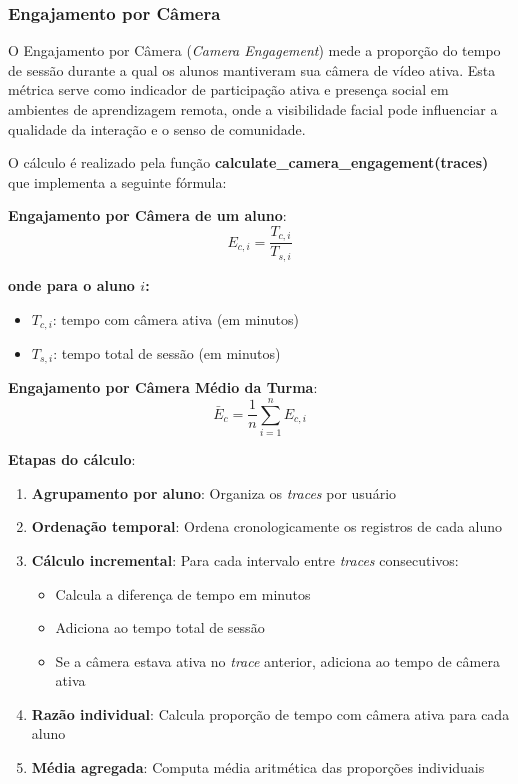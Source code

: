 \subsubsection{Engajamento por Câmera}
O Engajamento por Câmera (\textit{Camera Engagement}) mede a proporção do tempo de sessão durante a qual os alunos mantiveram sua câmera de vídeo ativa. Esta métrica serve como indicador de participação ativa e presença social em ambientes de aprendizagem remota, onde a visibilidade facial pode influenciar a qualidade da interação e o senso de comunidade.

O cálculo é realizado pela função \textbf{calculate\_camera\_engagement(traces)} que implementa a seguinte fórmula:

\textbf{Engajamento por Câmera de um aluno}:
\begin{equation}
E_{c,i} = \frac{T_{c,i}}{T_{s,i}}
\end{equation}

\textbf{onde para o aluno $i$:}
\begin{itemize}
    \item $T_{c,i}$: tempo com câmera ativa (em minutos)
    \item $T_{s,i}$: tempo total de sessão (em minutos)
\end{itemize}

\textbf{Engajamento por Câmera Médio da Turma}:
\begin{equation}
\bar{E}_c = \frac{1}{n} \sum_{i=1}^{n} E_{c,i}
\end{equation}

% 


\textbf{Etapas do cálculo}:
\begin{enumerate}
    \item \textbf{Agrupamento por aluno}: Organiza os \textit{traces} por usuário
    \item \textbf{Ordenação temporal}: Ordena cronologicamente os registros de cada aluno
    \item \textbf{Cálculo incremental}: Para cada intervalo entre \textit{traces} consecutivos:
          \begin{itemize}
              \item Calcula a diferença de tempo em minutos
              \item Adiciona ao tempo total de sessão
              \item Se a câmera estava ativa no \textit{trace} anterior, adiciona ao tempo de câmera ativa
          \end{itemize}
    \item \textbf{Razão individual}: Calcula proporção de tempo com câmera ativa para cada aluno
    \item \textbf{Média agregada}: Computa média aritmética das proporções individuais
\end{enumerate}

